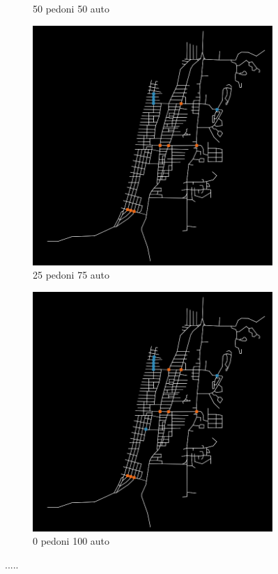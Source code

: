 \begin{figure}[ht]
\begin{subfigure}{0.45\textwidth}
        \caption{50 pedoni 50 auto}
    \end{subfigure}
    \hfill
    \begin{subfigure}{0.45\textwidth}
        \centering
        \includegraphics[width=\textwidth]{images/analisi/comparison-base-in-out-flow-25-75-car.png}
        \caption{25 pedoni 75 auto}
    \end{subfigure}
    \begin{subfigure}{0.45\textwidth}
        \centering
        \includegraphics[width=\textwidth]{images/analisi/comparison-base-in-out-flow-0-100-car.png}
        \caption{0 pedoni 100 auto}
    \end{subfigure}
    \caption{.....}
    \label{fig:analisi-comparison-in-out-flow-map-base}
\end{figure}
 
